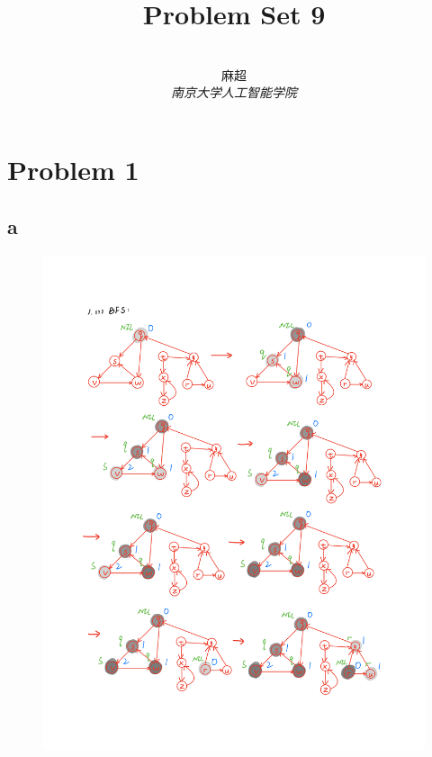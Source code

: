 \documentclass[12pt,a4paper,fontset=none]{ctexart}
\title{\textbf{Problem Set 9}}
\author{
\\
\Large{麻超 \quad 201300066}
\\[6pt]
{ \large \textit{南京大学人工智能学院}}\\[2pt]
}
\date{}
\begin{document}
\maketitle
\setcounter{page}{1}
\section{Problem 1}
\subsection{a}
\begin{figure}[H]
    \centering
    \includegraphics[width=1\linewidth]{IMG_0120.PNG}
\end{figure}
\end{document}
